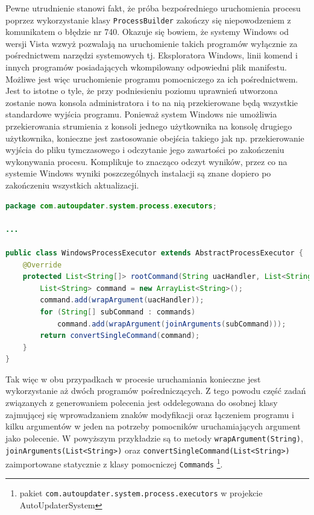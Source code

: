 \documentclass[polish,12pt,titlepage]{article}
\begin{document}
Pewne utrudnienie stanowi fakt, że próba bezpośredniego uruchomienia procesu
poprzez wykorzystanie klasy \texttt{ProcessBuilder} zakończy się
niepowodzeniem z komunikatem o błędzie nr 740. Okazuje się bowiem, że systemy
Windows od wersji Vista wzwyż pozwalają na uruchomienie takich programów
wyłącznie za pośrednictwem narzędzi systemowych tj. Eksploratora Windows,
linii komend i innych programów posiadających wkompilowany odpowiedni plik
manifestu. Możliwe jest więc uruchomienie programu pomocniczego za ich
pośrednictwem. Jest to istotne o tyle, że przy podniesieniu poziomu uprawnień
utworzona zostanie nowa konsola administratora i to na nią przekierowane będą
wszystkie standardowe wyjścia programu. Ponieważ system Windows nie umożliwia
przekierowania strumienia z konsoli jednego użytkownika na konsolę drugiego
użytkownika, konieczne jest zastosowanie obejścia takiego jak np.
przekierowanie wyjścia do pliku tymczasowego i odczytanie jego zawartości
po zakończeniu wykonywania procesu. Komplikuje to znacząco odczyt wyników,
przez co na systemie Windows wyniki poszczególnych instalacji są znane dopiero
po zakończeniu wszystkich aktualizacji.

\begin{lstlisting}[language=Java, frame=lines, numberstyle=\tiny, stepnumber=5, caption=Implementacja \texttt{WindowsProcessExecutor}., firstnumber=1]
package com.autoupdater.system.process.executors;

...

public class WindowsProcessExecutor extends AbstractProcessExecutor {
    @Override
    protected List<String[]> rootCommand(String uacHandler, List<String[]> commands) {
        List<String> command = new ArrayList<String>();
        command.add(wrapArgument(uacHandler));
        for (String[] subCommand : commands)
            command.add(wrapArgument(joinArguments(subCommand)));
        return convertSingleCommand(command);
    }
}
\end{lstlisting}

Tak więc w obu przypadkach w procesie uruchamiania konieczne jest
wykorzystanie aż dwóch programów pośredniczących. Z tego powodu część zadań
związanych z generowaniem polecenia jest oddelegowana do osobnej klasy
zajmującej się wprowadzaniem znaków modyfikacji oraz łączeniem programu 
i kilku argumentów w jeden na potrzeby pomocników uruchamiających argument
jako polecenie. W powyższym przykładzie są to metody
\texttt{wrapArgument(String)},
\texttt{joinArguments(List<String>)} oraz
\texttt{convertSingleCommand(List<String>)} zaimportowane statycznie z klasy
pomocniczej \texttt{Commands} \footnote{pakiet
\texttt{com.autoupdater.system.process.executors} w projekcie
AutoUpdaterSystem}.
\end{document}
